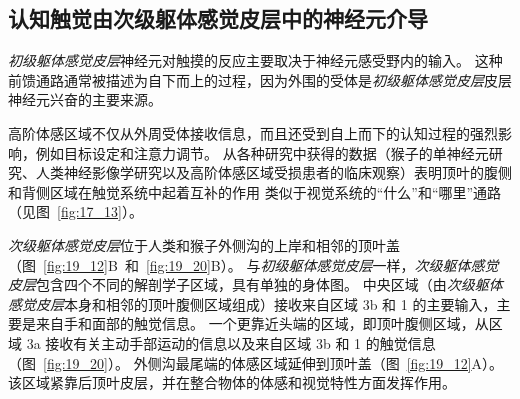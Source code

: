 \subsection{认知触觉由次级躯体感觉皮层中的神经元介导}

\textit{初级躯体感觉皮层}神经元对触摸的反应主要取决于神经元感受野内的输入。
这种前馈通路通常被描述为自下而上的过程，因为外围的受体是\textit{初级躯体感觉皮层}皮层神经元兴奋的主要来源。


高阶体感区域不仅从外周受体接收信息，而且还受到自上而下的认知过程的强烈影响，例如目标设定和注意力调节。
从各种研究中获得的数据（猴子的单神经元研究、人类神经影像学研究以及高阶体感区域受损患者的临床观察）表明顶叶的腹侧和背侧区域在触觉系统中起着互补的作用 类似于视觉系统的“什么”和“哪里”通路（见图~\ref{fig:17_13}）。


\textit{次级躯体感觉皮层}位于人类和猴子外侧沟的上岸和相邻的顶叶盖（图~\ref{fig:19_12}B~和~\ref{fig:19_20}B）。
与\textit{初级躯体感觉皮层}一样，\textit{次级躯体感觉皮层}包含四个不同的解剖学子区域，具有单独的身体图。
中央区域（由\textit{次级躯体感觉皮层}本身和相邻的顶叶腹侧区域组成）接收来自区域 3b 和 1 的主要输入，主要是来自手和面部的触觉信息。
一个更靠近头端的区域，即顶叶腹侧区域，从区域 3a 接收有关主动手部运动的信息以及来自区域 3b 和 1 的触觉信息（图~\ref{fig:19_20}）。
外侧沟最尾端的体感区域延伸到顶叶盖（图~\ref{fig:19_12}A）。
该区域紧靠后顶叶皮层，并在整合物体的体感和视觉特性方面发挥作用。



